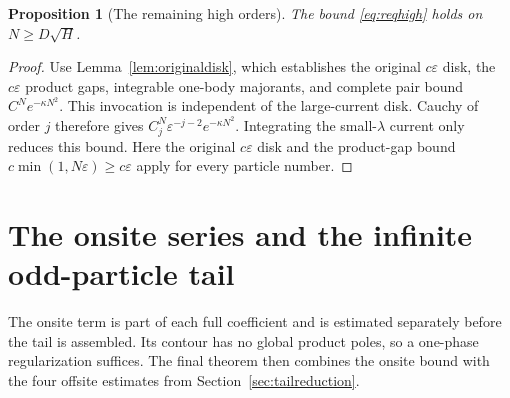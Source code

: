 \documentclass[11pt]{article}
\numberwithin{equation}{section}
\newtheorem{proposition}[theorem]{Proposition}
\theoremstyle{definition}
\newcommand{\eps}{\varepsilon}
\begin{document}
\begin{proposition}[The remaining high orders]\label{prop:highKS}
The bound \eqref{eq:reqhigh} holds on
\(N\ge D\sqrt H\).
\end{proposition}
\begin{proof}
Use Lemma~\ref{lem:originaldisk}, which establishes the original
\(c\eps\) disk, the \(c\eps\) product gaps, integrable one-body
majorants, and complete pair bound \(C^Ne^{-\kappa N^2}\).
This invocation is independent of the large-current disk.
Cauchy of order \(j\) therefore gives
\(C_j^N\eps^{-j-2}e^{-\kappa N^2}\).
Integrating the small-\(\lambda\) current only reduces this bound.
Here the original \(c\eps\) disk and the product-gap bound
\(c\min(1,N\eps)\ge c\eps\) apply for every particle number.
\end{proof}




\section{The onsite series and the infinite odd-particle tail}\label{sec:conclusion}

The onsite term is part of each full coefficient and is estimated
separately before the tail is assembled. Its contour has no global
product poles, so a one-phase regularization suffices. The final theorem
then combines the onsite bound with the four offsite estimates from
Section~\ref{sec:tailreduction}.
\end{document}
